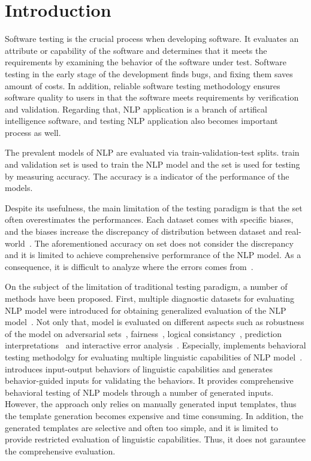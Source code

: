 \section{Introduction}
\label{sec:intro}

Software testing is the crucial process when developing software.  It
evaluates an attribute or capability of the software and determines
that it meets the requirements by examining the behavior of the
software under test. Software testing in the early stage of the
development finds bugs, and fixing them saves amount of costs. In
addition, reliable software testing methodology ensures software
quality to users in that the software meets requirements by
verification and validation. Regarding that, NLP application is a
branch of artifical intelligence software, and testing NLP application
also becomes important process as well.

The prevalent models of NLP are evaluated via train-validation-test
splits. train and validation set is used to train the NLP model and
the \ho set is used for testing by measuring accuracy. The accuracy is
a indicator of the performance of the models.

Despite its usefulness, the main limitation of the testing paradigm
is that the \ho set often overestimates the performances. Each dataset
comes with specific biases, and the biases increase the discrepancy of
distribution between dataset and
real-world~\cite{recht2019imagenetbias}. The aforementioned accuracy
on \ho set does not consider the discrepancy and it is limited to
achieve comprehensive performrance of the NLP model. As a consequence,
it is difficult to analyze where the errors comes
from~\cite{wu2019errudite}.

On the subject of the limitation of traditional testing paradigm, a
number of methods have been proposed. First, multiple diagnostic
datasets for evaluating NLP model were introduced for obtaining
generalized evaluation of the NLP model~\cite{wang2018glue}. Not only
that, model is evaluated on different aspects such as robustness of
the model on adversarial
sets~\cite{ribeiro2018sear,belinkov2018breaknmt,
  rychalska2019wildnlp,iyyer2018adversarial},
fairness~\cite{prabhakaran2019fairness,rottger2020hatecheck}, logical
consistancy~\cite{ribeiro2019consistencyeval}, prediction
interpretations~\cite{ribeiroSG16lime} and interactive error
analysis~\cite{wu2019errudite}. Especially, \Chlst implements
behavioral testing methodolgy for evaluating multiple linguistic
capabilities of NLP model~\cite{marcoACL2020checklist}. \Chlst
introduces input-output behaviors of linguistic capabilities and
generates behavior-guided inputs for validating the behaviors. It
provides comprehensive behavioral testing of NLP models through a
number of generated inputs. However, the approach only relies on
manually generated input templates, thus the template generation
becomes expensive and time consuming. In addition, the generated
templates are selective and often too simple, and it is limited to
provide restricted evaluation of linguistic capabilities. Thus, it
does not garauntee the comprehensive evaluation.

